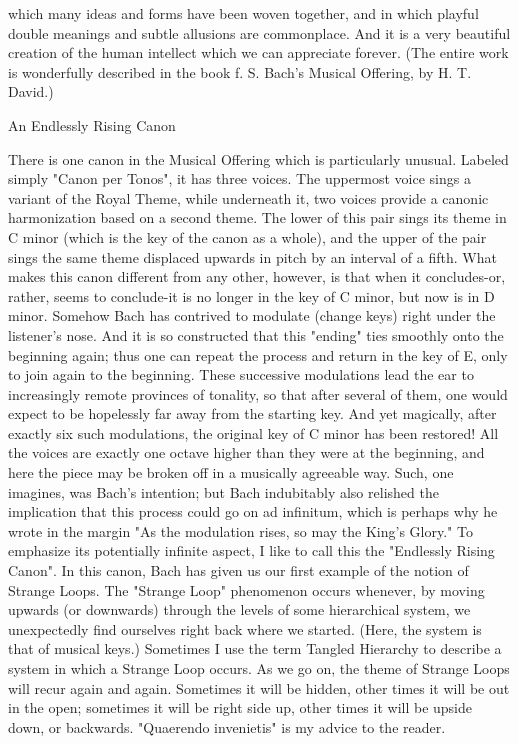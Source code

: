 






which many ideas and forms have been woven together, and in which playful double meanings and subtle allusions are commonplace. And it is a very beautiful creation of the human intellect which we can appreciate forever. (The entire work is wonderfully described in the book f. S. Bach's Musical Offering, by H. T. David.) 

An Endlessly Rising Canon 

There is one canon in the Musical Offering which is particularly unusual. Labeled simply "Canon per Tonos", it has three voices. The uppermost voice sings a variant of the Royal Theme, while underneath it, two voices provide a canonic harmonization based on a second theme. The lower of this pair sings its theme in C minor (which is the key of the canon as a whole), and the upper of the pair sings the same theme displaced upwards in pitch by an interval of a fifth. What makes this canon different from any other, however, is that when it concludes-or, rather, seems to conclude-it is no longer in the key of C minor, but now is in D minor. Somehow Bach has contrived to modulate (change keys) right under the listener's nose. And it is so constructed that this "ending" ties smoothly onto the beginning again; thus one can repeat the process and return in the key of E, only to join again to the beginning. These successive modulations lead the ear to increasingly remote provinces of tonality, so that after several of them, one would expect to be hopelessly far away from the starting key. And yet magically, after exactly six such modulations, the original key of C minor has been restored! All the voices are exactly one octave higher than they were at the beginning, and here the piece may be broken off in a musically agreeable way. Such, one imagines, was Bach's intention; but Bach indubitably also relished the implication that this process could go on ad infinitum, which is perhaps why he wrote in the margin "As the modulation rises, so may the King's Glory." To emphasize its potentially infinite aspect, I like to call this the "Endlessly Rising Canon". In this canon, Bach has given us our first example of the notion of Strange Loops. The "Strange Loop" phenomenon occurs whenever, by moving upwards (or downwards) through the levels of some hierarchical system, we unexpectedly find ourselves right back where we started. (Here, the system is that of musical keys.) Sometimes I use the term Tangled Hierarchy to describe a system in which a Strange Loop occurs. As we go on, the theme of Strange Loops will recur again and again. Sometimes it will be hidden, other times it will be out in the open; sometimes it will be right side up, other times it will be upside down, or backwards. "Quaerendo invenietis" is my advice to the reader. 



